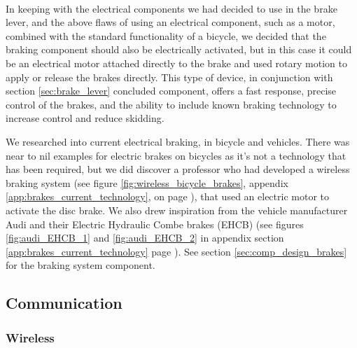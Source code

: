 \documentclass[a4paper]{report}
\begin{document}
\paragraph{}In keeping with the electrical components we had decided to use in the brake lever, and the above flaws of using an electrical component, such as a motor, combined with the standard functionality of a bicycle, we decided that the braking component should also be electrically activated, but in this case it could be an electrical motor attached directly to the brake and used rotary motion to apply or release the brakes directly. This type of device, in conjunction with section \ref{sec:brake_lever} concluded component, offers a fast response, precise control of the brakes, and the ability to include known braking technology to increase control and reduce skidding.

We researched into current electrical braking, in bicycle and vehicles. There was near to nil examples for electric brakes on bicycles as it's not a technology that has been required, but we did discover a professor \cite{wireless_bicycle_brakes} who had developed a wireless braking system (see figure \ref{fig:wireless_bicycle_brakes}, appendix \ref{app:brakes_current_technology}, on page \pageref{fig:wireless_bicycle_brakes}), that used an electric motor to activate the disc brake. We also drew inspiration from the vehicle manufacturer Audi and their Electric Hydraulic Combe brakes (EHCB) (see figures \ref{fig:audi_EHCB_1} and \ref{fig:audi_EHCB_2} in appendix section \ref{app:brakes_current_technology} page \pageref{app:brakes_current_technology}). See section \ref{sec:comp_design_brakes} for the braking system component.


\subsection{Communication}

\subsubsection{Wireless}
\end{document}
